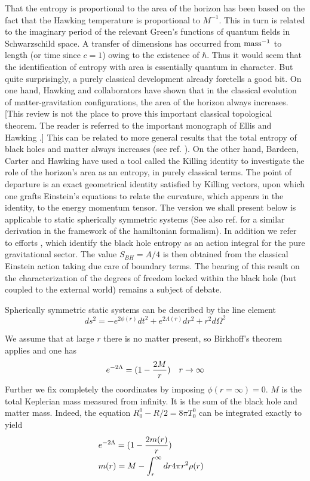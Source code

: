 \documentclass[12pt,oneside]{report}
\begin{document}
That the entropy is proportional to the area of the horizon 
has been based on the fact that the Hawking temperature is
proportional to $M^{-1}$. This in turn is related to the
imaginary period of the relevant Green's functions of
quantum fields in Schwarzschild space. A transfer of
dimensions has occurred from ${\rm mass}^{-1}$ to length (or
time since $c=1$) owing to the existence of $\hbar$. Thus it
would seem that the identification of entropy with area is
essentially quantum in character. But quite surprisingly, a
purely classical development already foretells a good bit.
On one hand, Hawking and collaborators have shown that in
the classical evolution of matter-gravitation
configurations, the area of the horizon always increases.
[This review is not the place to prove this important
classical topological theorem. The reader is referred to the
important monograph of Ellis and Hawking \cite{EH}.] This can be related to more
general results that the total entropy of black holes and matter always increases
(see  ref. \cite{Beck94}). On the other
hand, Bardeen, Carter and Hawking \cite{BCH}  have used a 
tool called the
Killing identity to investigate the role of the horizon's area
as an entropy, in purely classical
terms. 
The point of departure is an exact
geometrical identity satisfied by Killing vectors, upon which one grafts
Einstein's equations to relate the curvature, which appears
in the identity, to the energy momentum tensor. 
The version we shall present below is applicable to static
spherically symmetric systems (See also ref. \cite{CaEn} for a similar
derivation in the framework of the hamiltonian formalism). 
In addition we refer to efforts \cite{GibbonsHawking}, \cite{YorkB}
which identify the black hole
entropy as an action integral for the pure gravitational sector.
The value $ S_{BH} = A / 4 $ is then obtained from the
classical Einstein action taking due care of boundary terms. The
bearing of this result on the characterization  of the degrees
of freedom locked within the black hole (but coupled to the
external world) remains a subject of debate.

Spherically symmetric static systems can be described by the
line element
\begin{equation}
ds^2 = -e^{2 \phi(r)}dt^2 + e^{2 \Lambda(r)} dr^2 + r^2
d\Omega^2
\label{K.1}
\end{equation}

We assume that at large $r$ there is no matter present, so
Birkhoff's theorem applies and one has
\begin{equation}
e^{-2 \Lambda} = (1 - {2 M\over r})
\quad r \to \infty
\label{K.2}
\end{equation}
 Further we fix
completely the coordinates by imposing $\phi(r=\infty)=0$. 
$M$ is the total Keplerian mass measured from infinity. It is the sum of the
black hole and matter mass.  Indeed, the equation $R^0_0 - R/2 = 8 \pi T^0_0$ can be
integrated exactly to yield
\begin{eqnarray}
&e^{-2 \Lambda} = (1 - {2 m(r) \over r})&\nonumber\\
&m(r) = M - \int_r^\infty dr 4 \pi r^2 \rho (r)
\label{K.2b}
\end{eqnarray}
\end{document}
